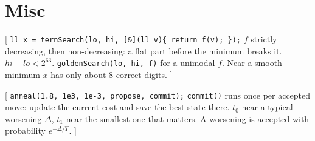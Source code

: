 \section{Misc}
\twolevels
{}

[
	 \texttt{ll x = ternSearch(lo, hi, [\&](ll v)\{ return f(v); \});}
	 $f$ strictly decreasing, then non-decreasing: a flat part before the minimum breaks it. $hi - lo < 2^{63}$.
	 \texttt{goldenSearch(lo, hi, f)} for a unimodal $f$. Near a smooth minimum $x$ has only about 8 correct digits.
]\label{ternary}

[
	 \texttt{anneal(1.8, 1e3, 1e-3, propose, commit);}
	 \texttt{commit()} runs once per accepted move: update the current cost and save the best state there.
	 $t_0$ near a typical worsening $\Delta$, $t_1$ near the smallest one that matters. A worsening is accepted with probability $e^{-\Delta / T}$.
]\label{anneal}

